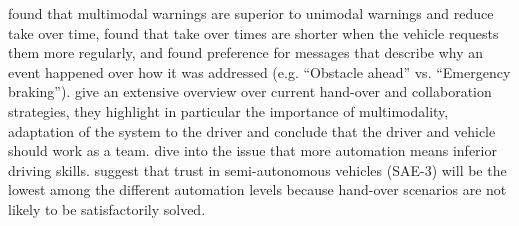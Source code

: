 \citet{Politis} found that multimodal warnings are superior to unimodal warnings and reduce take over time, \citet{Merat2014TransitionVehicle} found that take over times are shorter when the vehicle requests them more regularly, and \citet{Koo2015} found preference for messages that describe why an event happened over how it was addressed (e.g. “Obstacle ahead” vs. “Emergency braking”).  \citet{Walch2017} give an extensive overview over current hand-over and collaboration strategies, they highlight in particular the importance of multimodality, adaptation of the system to the driver and conclude that the driver and vehicle should work as a team. \citet{Meschtscherjakova} dive into the issue that more automation means inferior driving skills. \citet{Rodel} suggest that trust in semi-autonomous vehicles (SAE-3) will be the lowest among the different automation levels because hand-over scenarios are not likely to be satisfactorily solved. 




